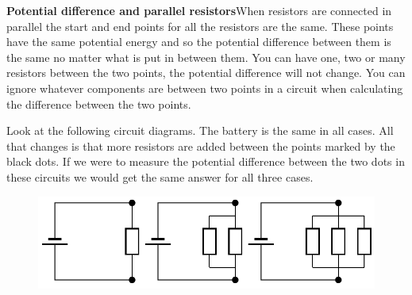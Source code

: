           \par 




        \label{m38776*id64009}\noindent{}\textbf{Potential difference and parallel resistors}When resistors are connected in parallel the start and end points for all the resistors are the same. These points have the same potential energy and so the potential difference between them is the same no matter what is put in between them. You can have one, two or many resistors between the two points, the potential difference will not change. You can ignore whatever components are between two points in a circuit when calculating the difference between the two points.\par 
        \label{m38776*id64017}Look at the following circuit diagrams. The battery is the same in all cases. All that changes is that more resistors are added between the points marked by the black dots. If we were to measure the potential difference between the two dots in these circuits we would get the same answer for all three cases.\par 
        \label{m38776*id64023}
          
    \setcounter{subfigure}{0}


	\begin{figure}[H] %
    \begin{center}
    \label{m38776*id64026!!!underscore!!!media}\label{m38776*id64026!!!underscore!!!printimage}\includegraphics{col11305.imgs/m38776_PG10C9_016.png} %
        
      \vspace{2pt}
    \vspace{.1in}
    
    \end{center}

 \end{figure}   

    \addtocounter{footnote}{-0}
    
